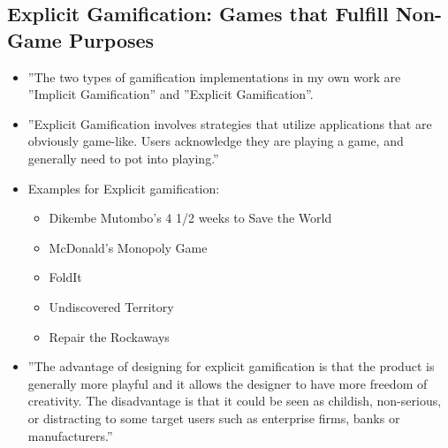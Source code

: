 \subsection{Explicit Gamification: Games that Fulfill Non-Game Purposes}
\begin{itemize}
    \item ''The two types of gamification implementations in my own work are ''Implicit Gamification'' and ''Explicit Gamification''.
    \item ''Explicit Gamification involves strategies that utilize applications that are obviously game-like. Users acknowledge they are playing a game, and generally need to pot into playing.''
    \item Examples for Explicit gamification: 
    \begin{itemize}
        \item Dikembe Mutombo's 4 1/2 weeks to Save the World
        \item McDonald's Monopoly Game
        \item FoldIt
        \item Undiscovered Territory
        \item Repair the Rockaways
    \end{itemize}
    \item ''The advantage of designing for explicit gamification is that the product is generally more playful and it allows the designer to have more freedom of creativity. The disadvantage is that it could be seen as childish, non-serious, or distracting to some target users such as enterprise firms, banks or manufacturers.''
\end{itemize}

